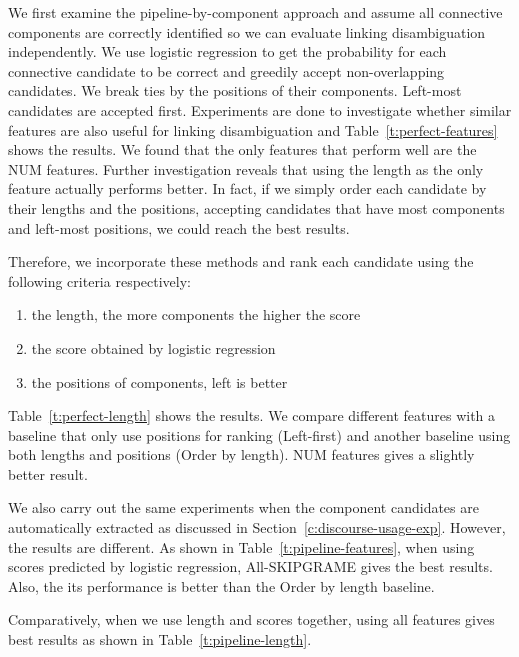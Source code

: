 We first examine the pipeline-by-component approach and assume all connective
components are correctly identified so we can evaluate linking disambiguation
independently. We use logistic regression
to get the probability for each connective candidate to be correct and greedily
accept non-overlapping candidates. We break ties by the positions of their components.
Left-most candidates are accepted first. Experiments are done to investigate whether
similar features are also useful for linking disambiguation and 
Table~\ref{t:perfect-features} shows the results. We found that
the only features that perform well are the NUM features. Further investigation
reveals that using the length as the only feature actually performs better.
In fact, if we simply order each candidate by their lengths and the positions,
accepting candidates that have most components and left-most positions, we could
reach the best results.




Therefore, we incorporate these methods and rank each candidate using the following
criteria respectively:

\begin{enumerate}
    \item the length, the more components the higher the score
    \item the score obtained by logistic regression
    \item the positions of components, left is better
\end{enumerate}

Table~\ref{t:perfect-length} shows the results. We compare different features
with a baseline that only use positions for ranking (Left-first) and another
baseline using both lengths and positions (Order by length). NUM features gives
a slightly better result.



We also carry out the same experiments when the component candidates are automatically
extracted as discussed in Section~\ref{c:discourse-usage-exp}. However, the results
are different. As shown in Table~\ref{t:pipeline-features}, when using scores
predicted by logistic regression, All-SKIPGRAME gives the best results. Also,
the its performance is better than the Order by length baseline.



Comparatively, when we use length and scores together, using all features gives
best results as shown in Table~\ref{t:pipeline-length}.

